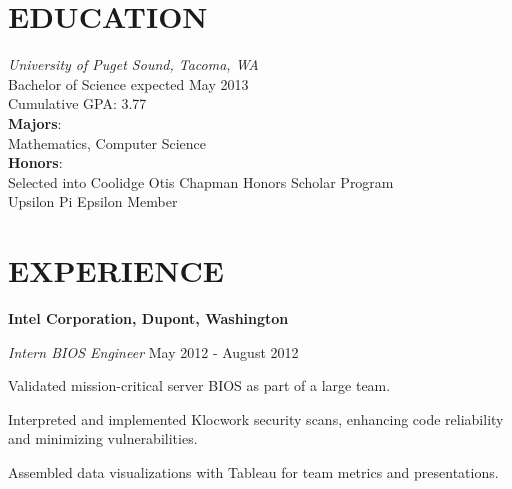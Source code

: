 \documentclass[line,margin]{res}
\newenvironment{itemize*}%
  {\begin{itemize}%
    \setlength{\parsep}{0pt}
    \setlength{\itemsep}{0pt}%
    \setlength{\parskip}{0pt}}%
  {\end{itemize}}
\begin{document}
\address{2214 N. Washington Street, Tacoma, WA 98406} 
\address{kwenholz@pugetsound.edu\hspace*{2mm} \vline \hspace*{2mm} (406)546-9210}

 
\begin{resume}
\vspace*{.3cm}

\section{EDUCATION} {\sl University of Puget Sound, Tacoma, WA} \\
                Bachelor of Science
                expected May 2013 \\
                Cumulative GPA: 3.77\\
                \textbf{Majors}: \\
\hspace*{5mm}                Mathematics, Computer Science \\
                \textbf{Honors}:\\
\hspace*{5mm}   Selected into Coolidge Otis Chapman Honors Scholar Program\\
\hspace*{5mm}   Upsilon Pi Epsilon Member\\

\vspace*{.2cm}

\section{EXPERIENCE} 

\textbf{Intel Corporation, Dupont, Washington}

{\sl Intern BIOS Engineer} \hfill May 2012 - August 2012
\begin{itemize*}
    \item Validated mission-critical server BIOS as part of a large team.
    \item Interpreted and implemented Klocwork security scans, enhancing 
        code reliability and minimizing vulnerabilities.
    \item Assembled data visualizations with Tableau for team metrics and 
        presentations.
\end{itemize*}            


\end{resume}
\end{document}
